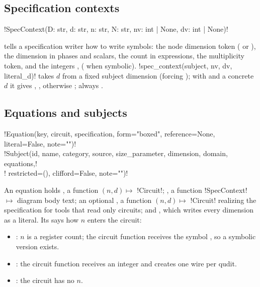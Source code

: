 \subsection{Specification contexts}

\begin{signature}
\py!SpecContext(D: str, d: str, n: str, N: str, nv: int | None, dv: int | None)!
\end{signature}
\noindent tells a specification writer how to write symbols:  the node dimension token
( or ),  the dimension in phases and scalars,  the count
in expressions,  the \bbox{} multiplicity token, and the integers , 
( when symbolic). \py!spec_context(subject, nv, dv, literal_d)! takes $d$ from a fixed
subject dimension (forcing ); with  and a concrete $d$ it gives
, , otherwise ; always
.

\subsection{Equations and subjects}

\begin{signature}
\py!Equation(key, circuit, specification, form="boxed", reference=None, literal=False, note="")!\\
\py!Subject(id, name, category, source, size_parameter, dimension, domain, equations,!\\
\py!        restricted=(), clifford=False, note="")!
\end{signature}

An equation holds , a function $(n, d)\mapsto$ \py!Circuit!; ,
a function \py!SpecContext! $\mapsto$ diagram body text; an optional , a
function $(n,d)\mapsto$ \py!Circuit! realizing the specification for tools that read only
circuits; and , which writes every dimension as a literal. Its  says how
$n$ enters the circuit:
\begin{itemize}
\item {}: $n$ is a register count; the circuit function receives the symbol
  , so a symbolic version exists.
\item {}: the circuit function receives an integer and creates one wire per qudit.
\item {}: the circuit has no $n$.
\end{itemize}

